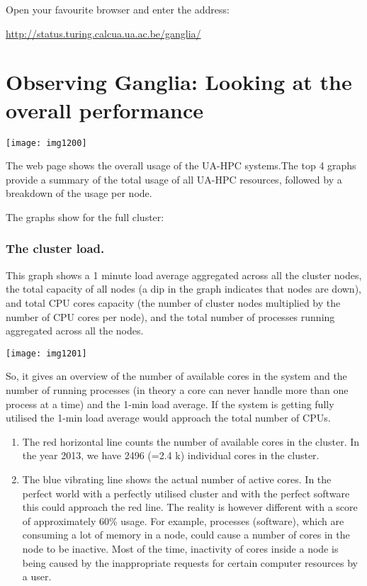 Open your favourite browser and enter the address:

\url{http://status.turing.calcua.ua.ac.be/ganglia/}

\section{Observing Ganglia: Looking at the overall performance}

\texttt{[image: img1200]}

The web page shows the overall usage of the UA-HPC systems.The top 4 graphs
provide a summary of the total usage of all UA-HPC resources, followed by a
breakdown of the usage per node.

The graphs show for the full cluster:

\subsubsection{The cluster load.}

This graph shows a 1 minute load average aggregated across all the cluster
nodes, the total capacity of all nodes (a dip in the graph indicates that nodes
are down), and total CPU cores capacity (the number of cluster nodes multiplied
by the number of CPU cores per node), and the total number of processes running
aggregated across all the nodes.

\texttt{[image: img1201]}

So, it gives an overview of the number of available cores in the system and the
number of running processes (in theory a core can never handle more than one
process at a time) and the 1-min load average. If the system is getting fully
utilised the 1-min load average would approach the total number of CPUs.

\begin{enumerate}
\item  The red horizontal line counts the number of available cores in the cluster. In the year 2013, we have 2496 (=2.4 k) individual cores in the cluster.
\item  The blue vibrating line shows the actual number of active cores. In the perfect world with a perfectly utilised cluster and with the perfect software this could approach the red line. The reality is however different with a score of approximately 60\% usage. For example, processes (software), which are consuming a lot of memory in a node, could cause a number of cores in the node to be inactive.  Most of the time, inactivity of cores inside a node is being caused by the inappropriate requests for certain computer resources by a user.
\end{enumerate}

